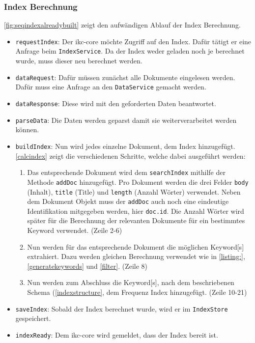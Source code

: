 \subsubsection{Index Berechnung}
\autoref{fig:seqindexalreadybuilt} zeigt den aufwändigen Ablauf der Index Berechnung. 
\begin{itemize}
    \item \texttt{requestIndex}: Der \gls{ikc-core} möchte Zugriff auf den Index. Dafür tätigt er eine Anfrage beim \texttt{IndexService}. Da der Index weder geladen noch je berechnet wurde, muss dieser neu berechnet werden.
    \item \texttt{dataRequest}: Dafür müssen zunächst alle Dokumente eingelesen werden. Dafür muss eine Anfrage an den \texttt{DataService} gemacht werden.
    \item \texttt{dataResponse}: Diese wird mit den geforderten Daten beantwortet.
    \item \texttt{parseData}: Die Daten werden geparst damit sie weiterverarbeitet werden können.
    \item \texttt{buildIndex}: Nun wird jedes einzelne Dokument, dem Index hinzugefügt. \autoref{calcindex} zeigt die verschiedenen Schritte, welche dabei ausgeführt werden:
    \begin{enumerate}
        \item Das entsprechende Dokument wird dem \texttt{searchIndex} mithilfe der Methode \texttt{addDoc} hinzugefügt. Pro Dokument werden die drei Felder \texttt{body} (Inhalt), \texttt{title} (Title) und \texttt{length} (Anzahl Wörter) verwendet. Neben dem Dokument Objekt muss der \texttt{addDoc} auch noch eine eindeutige Identifikation mitgegeben werden, hier \texttt{doc.id}. Die Anzahl Wörter wird später für die Berechnung der relevanten Dokumente für ein bestimmtes \gls{Keyword} verwendet. (Zeile 2-6)
        \item Nun werden für das entsprechende Dokument die mög\-lich\-en \gls{Keyword}[s] extrahiert. Dazu werden gleichen Berechnung verwendet wie in \autoref{listing:}, \autoref{generatekeywords} und \autoref{filter}. (Zeile 8)
        \item Nun werden zum Abschluss die \gls{Keyword}[s], nach dem beschriebenen Schema (\autoref{indexstructure}, dem Frequenz Index hinzugefügt. (Zeile 10-21)
    \end{enumerate}
    \item \texttt{saveIndex}: Sobald der Index berechnet wurde, wird er im \texttt{In\-dex\-Store} gespeichert.
    \item \texttt{indexReady}: Dem \gls{ikc-core} wird gemeldet, dass der Index bereit ist.
\end{itemize}

